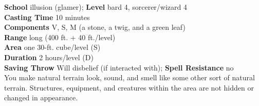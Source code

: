 \textbf{School} illusion (glamer); \textbf{Level} bard 4, sorcerer/wizard 4\\
\textbf{Casting Time} 10 minutes\\
\textbf{Components} V, S, M (a stone, a twig, and a green leaf)\\
\textbf{Range} long (400 ft. + 40 ft./level)\\
\textbf{Area} one 30-ft. cube/level (S)\\
\textbf{Duration} 2 hours/level (D)\\
\textbf{Saving Throw }Will disbelief (if interacted with); \textbf{Spell Resistance} no\\
You make natural terrain look, sound, and smell like some other sort of natural terrain. Structures, equipment, and creatures within the area are not hidden or changed in appearance.\\
